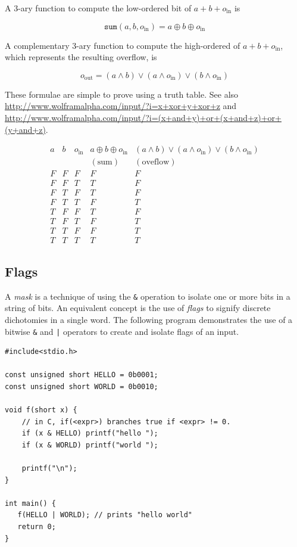 \documentclass{book}
\begin{document}
A 3-ary function to compute the low-ordered bit of $a+b+o_{\textrm{in}}$ is

\[
\texttt{sum} (a,b,o_{\textrm{in}}) = a \oplus b \oplus o_{\textrm{in}}
\]

A complementary 3-ary function to compute the high-ordered of $a+b+o_{\textrm{in}}$, which represents the resulting overflow, is

\[
o_{\textrm{out}} = (a \wedge b) \vee (a \wedge o_{\textrm{in}}) \vee (b \wedge o_{\textrm{in}})
\]

These formulae are simple to prove using a truth table. See also \url{http://www.wolframalpha.com/input/?i=x+xor+y+xor+z} and \url{http://www.wolframalpha.com/input/?i=(x+and+y)+or+(x+and+z)+or+(y+and+z)}.

\begin{equation*}
\begin{array}{c|c|c|c|c}
a & b & o_{\textrm{in}} & a \oplus b \oplus o_{\textrm{in}} & (a \wedge b) \vee (a \wedge o_{\textrm{in}}) \vee (b \wedge o_{\textrm{in}}) \\
  &   &   & (\textrm{sum}) & (\textrm{oveflow}) \\
\hline
F & F & F & F & F \\
F & F & T & T & F \\
F & T & F & T & F \\
F & T & T & F & T \\
T & F & F & T & F \\
T & F & T & F & T \\
T & T & F & F & T \\
T & T & T & T & T
\end{array}
\end{equation*}

\subsection{Flags}

A \textit{mask} is a technique of using the \texttt{\&} operation to isolate one or more bits in a string of bits. An equivalent concept is the use of \textit{flags} to signify discrete dichotomies in a single word. The following program demonstrates the use of a bitwise \texttt{\&} and \texttt{|} operators to create and isolate flags of an input.

\begin{lstlisting}
#include<stdio.h>

const unsigned short HELLO = 0b0001;
const unsigned short WORLD = 0b0010;

void f(short x) {
    // in C, if(<expr>) branches true if <expr> != 0.
    if (x & HELLO) printf("hello ");
    if (x & WORLD) printf("world ");
    
    printf("\n");
}

int main() {
   f(HELLO | WORLD); // prints "hello world"
   return 0;
}
\end{lstlisting}
\end{document}

